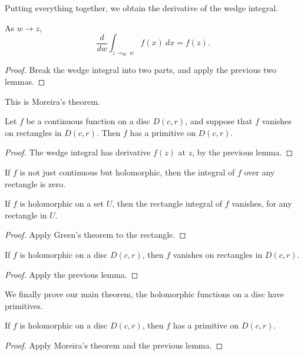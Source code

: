 Putting everything together, we obtain the derivative of the wedge integral.
\begin{theorem}
  \label{deriv_of_wedgeInt}
  \leanok
  As $w \to z$,
  $$
    \frac{d}{dw} \int_{z\to_W\  w} f(x)\ dx
    =
    f(z)
    .
  $$
  \end{theorem}


 \begin{proof}

 Break the wedge integral into two parts, and apply the previous two lemmas.

 \end{proof}


This is Moreira's theorem.
\begin {theorem}
\label {moreira}
\leanok
Let $f$ be a continuous function on a disc $D(c,r)$, and suppose that $f$ vanishes on rectangles in $D(c,r)$. Then $f$ has a primitive on $D(c,r)$.
\end {theorem}


 \begin{proof} The wedge integral has derivative $f(z)$ at $z$, by the previous lemma. \end{proof}


If $f$ is not just continuous but holomorphic, then the integral of $f$ over any rectangle is zero.
\begin{lemma}
  \label{vanishesOnRectangles_of_holomorphic}
  \leanok
  If $f$ is holomorphic on a set $U$, then the rectangle integral of $f$ vanishes, for any rectangle in $U$.
\end{lemma}


 \begin{proof}

 Apply Green's theorem to the rectangle.

 \end{proof}


\begin{lemma}
  \label{vanishesOnRectanglesInDisc_of_holomorphic}
  \leanok
  If $f$ is holomorphic on a disc $D(c,r)$, then $f$ vanishes on rectangles in $D(c,r)$.
\end{lemma}


 \begin{proof} Apply the previous lemma. \end{proof}


We finally prove our main theorem, the holomorphic functions on a disc have primitives.
\begin{theorem}
  \label{hasPrimitives_of_disc}
  \leanok
  If $f$ is holomorphic on a disc $D(c,r)$, then $f$ has a primitive on $D(c,r)$.
\end{theorem}


 \begin{proof} Apply Moreira's theorem and the previous lemma. \end{proof}

